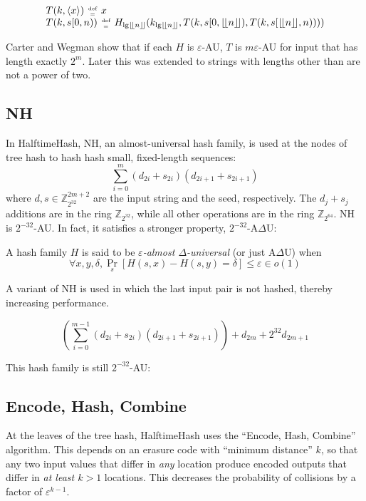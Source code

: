 \documentclass[runningheads]{llncs}
\newcommand{\ints}{\mathbb{Z}}
\newcommand{\defeq}{\;\genfrac{}{}{0pt}{2}{\text{def}}{=}\;}
\begin{document}
\begin{equation}
\label{algebraic-badger}
\begin{array}{l}
T(k, \langle x \rangle) \defeq x \\
T(k, s[0,n)) \defeq H_{ \lg \lfloor\!\lfloor n \rfloor\!\rfloor}
(k_{ \lg \lfloor\!\lfloor n \rfloor\!\rfloor},
T(k, s[0,\lfloor\!\lfloor n \rfloor\!\rfloor),
T(k, s[\lfloor\!\lfloor n \rfloor\!\rfloor, n) )))
\end{array}
\end{equation}

Carter and Wegman show that if each $H$ is $\varepsilon$-AU, $T$ is $m\varepsilon$-AU for input that has length exactly $2^m$.
Later this was extended to strings with lengths other than are not a power of two.~\cite{badger}

\subsection{NH}

In HalftimeHash, NH, an almost-universal hash family, is used at the nodes of tree hash to hash hash small, fixed-length sequences: \cite{umac}
\[
\sum_{i=0}^m (d_{2i} + s_{2i})(d_{2i+1} + s_{2i+1})
\]
where $d, s \in \ints_{2^{32}}^{2m+2}$ are the input string and the seed, respectively.
The $d_j + s_j$ additions are in the ring $\ints_{2^{32}}$, while all other operations are in the ring $\ints_{2^{64}}$.
NH is $2^{-32}$-AU.
In fact, it satisfies a stronger property, $2^{-32}$-A$\Delta$U:~\cite{umac}

\begin{definition}
  A hash family $H$ is said to be {\em $\varepsilon$-almost $\Delta$-universal} (or just A$\Delta$U) when
  \[
  \forall x,y,\delta, \Pr_s[H(s,x) - H(s,y) = \delta] \leq \varepsilon \in o(1)
  \]
\end{definition}

A variant of NH is used in which the last input pair is not hashed, thereby increasing performance.

\[
\left(\sum_{i=0}^{m-1} (d_{2i} + s_{2i})(d_{2i+1} + s_{2i+1})\right) + d_{2m} + 2^{32} d_{2m+1}
\]

This hash family is still $2^{-32}$-AU: \cite{badger}

\subsection{Encode, Hash, Combine}

At the leaves of the tree hash, HalftimeHash uses the ``Encode, Hash, Combine'' algorithm.\cite{ehc-nandi}
This depends on an erasure code with ``minimum distance'' $k$, so that any two input values that differ in {\em any} location produce encoded outputs that differ in {\em at least $k > 1$} locations.
This decreases the probability of collisions by a factor of $\varepsilon^{k-1}$.
\end{document}
